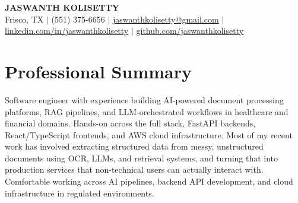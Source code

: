 \documentclass[letterpaper,10.5pt]{article}
\begin{document}
\begin{center}
    \textbf{\Huge \scshape JASWANTH KOLISETTY} \\ \vspace{1pt}
    Frisco, TX $|$ (551) 375-6656 $|$
    \href{mailto:jaswanthkolisetty@gmail.com}{\underline{jaswanthkolisetty@gmail.com}} $|$
    \href{https://linkedin.com/in/jaswanthkolisetty}{\underline{linkedin.com/in/jaswanthkolisetty}} $|$
    \href{https://github.com/jaswanthkolisetty}{\underline{github.com/jaswanthkolisetty}}
\end{center}

\section{Professional Summary}
\small{
Software engineer with experience building AI-powered document processing platforms, RAG pipelines, and LLM-orchestrated workflows in healthcare and financial domains. Hands-on across the full stack, FastAPI backends, React/TypeScript frontends, and AWS cloud infrastructure. Most of my recent work has involved extracting structured data from messy, unstructured documents using OCR, LLMs, and retrieval systems, and turning that into production services that non-technical users can actually interact with. Comfortable working across AI pipelines, backend API development, and cloud infrastructure in regulated environments.
}
\end{document}
